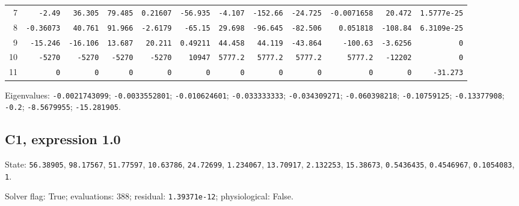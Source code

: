 \begin{landscape}
\begin{tabular}{rrrrrrrrrrrr}
7 & \texttt{-2.49} & \texttt{36.305} & \texttt{79.485} & \texttt{0.21607} & \texttt{-56.935} & \texttt{-4.107} & \texttt{-152.66} & \texttt{-24.725} & \texttt{-0.0071658} & \texttt{20.472} & \texttt{1.5777e-25} \\

8 & \texttt{-0.36073} & \texttt{40.761} & \texttt{91.966} & \texttt{-2.6179} & \texttt{-65.15} & \texttt{29.698} & \texttt{-96.645} & \texttt{-82.506} & \texttt{0.051818} & \texttt{-108.84} & \texttt{6.3109e-25} \\

9 & \texttt{-15.246} & \texttt{-16.106} & \texttt{13.687} & \texttt{20.211} & \texttt{0.49211} & \texttt{44.458} & \texttt{44.119} & \texttt{-43.864} & \texttt{-100.63} & \texttt{-3.6256} & \texttt{0} \\

10 & \texttt{-5270} & \texttt{-5270} & \texttt{-5270} & \texttt{-5270} & \texttt{10947} & \texttt{5777.2} & \texttt{5777.2} & \texttt{5777.2} & \texttt{5777.2} & \texttt{-12202} & \texttt{0} \\

11 & \texttt{0} & \texttt{0} & \texttt{0} & \texttt{0} & \texttt{0} & \texttt{0} & \texttt{0} & \texttt{0} & \texttt{0} & \texttt{0} & \texttt{-31.273} \\

\bottomrule\end{tabular}\par\endgroup

{\scriptsize Eigenvalues: \texttt{-0.0021743099}; \texttt{-0.0033552801}; \texttt{-0.010624601}; \texttt{-0.033333333}; \texttt{-0.034309271}; \texttt{-0.060398218}; \texttt{-0.10759125}; \texttt{-0.13377908}; \texttt{-0.2}; \texttt{-8.5679955}; \texttt{-15.281905}.\par}

\clearpage
\subsection*{C1, expression 1.0}
{\scriptsize State: \texttt{56.38905}, \texttt{98.17567}, \texttt{51.77597}, \texttt{10.63786}, \texttt{24.72699}, \texttt{1.234067}, \texttt{13.70917}, \texttt{2.132253}, \texttt{15.38673}, \texttt{0.5436435}, \texttt{0.4546967}, \texttt{0.1054083}, \texttt{1}.\par

Solver flag: True; evaluations: 388; residual: \texttt{1.39371e-12}; physiological: False.\par}


\end{landscape}
